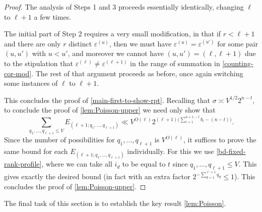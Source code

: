 \documentclass[11pt,reqno]{amsart}
\numberwithin{equation}{section}
\theoremstyle{definition}
\theoremstyle{remark}
\newcommand{\eps}{\varepsilon}
\renewcommand{\le}{\leqslant}
\begin{document}
\begin{proof}
The analysis of Steps 1 and 3 proceeds essentially identically, changing $\ell$ to $\ell +1$ a few times.

The initial part of Step 2 requires a very small modification, in that if $r < \ell + 1$ and there are only $r$ distinct $\eps^{(u)}$, then we must have $\eps^{(u)} = \eps^{(u')}$ for some pair $(u,u')$ with $u < u'$, and moreover we cannot have $(u,u') = (\ell, \ell + 1)$ due to the stipulation that $\eps^{(\ell)} \ne \eps^{(\ell + 1)}$ in the range of summation in \cref{counting-cor-mod}. The rest of that argument proceeds as before, once again switching some instances of $\ell$ to $\ell + 1$. 

This concludes the proof of \cref{main-first-to-show-rpt}. Recalling that $\sigma \asymp V^{1/2} 2^{n - t}$, to conclude the proof of \cref{lem:Poisson-upper} we need only show that 
\begin{equation*}
 \sum_{q_1,\dots, q_{\ell +1} \le V} E_{(\ell+1; q_1,\dots, q_{\ell+1})} \ll V^{O(\ell)} 2^{(\ell+1) \big(\sum_{i =1}^{n + 1 - t} b_i - (n - t) \big)}.
\end{equation*}
Since the number of possibilities for $q_1,\dots, q_{\ell + 1}$ is $V^{O(\ell)}$, it suffices to prove the same bound for each $E_{(\ell+1; q_1,\dots, q_{\ell+1})}$ individually.
For this we use \cref{bd-fixed-rank-profile}, where we can take all $i_d$ to be equal to $t$ since $q_1,\dots, q_{\ell+1} \le V$. This gives exactly the desired bound (in fact with an extra factor $2^{-\sum_{d = 1}^{\ell + 1} q_d} \le 1$). This concludes the proof of \cref{lem:Poisson-upper}.\end{proof} 



The final task of this section is to establish the key result \cref{lem:Poisson}.
\end{document}
